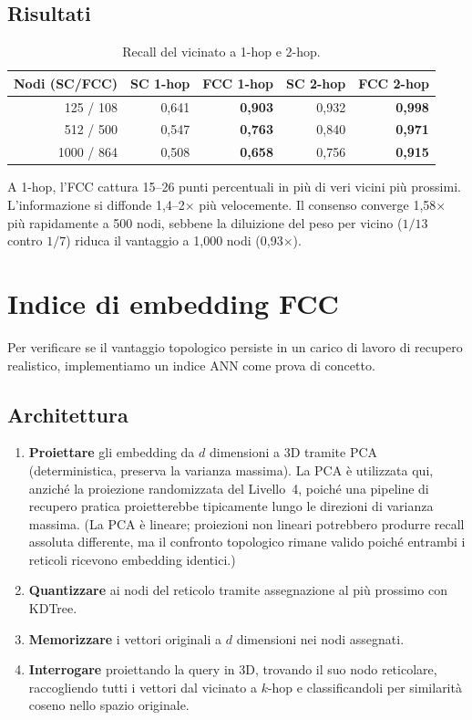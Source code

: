\documentclass[11pt]{article}
\begin{document}
\subsection{Risultati}

\begin{table}[H]
\centering
\caption{Recall del vicinato a 1-hop e 2-hop.}
\label{tab:recall}
\begin{tabular}{rrrrr}
\toprule
Nodi (SC/FCC) & SC 1-hop & FCC 1-hop & SC 2-hop & FCC 2-hop \\
\midrule
125 / 108   & 0,641 & \textbf{0,903} & 0,932 & \textbf{0,998} \\
512 / 500   & 0,547 & \textbf{0,763} & 0,840 & \textbf{0,971} \\
1000 / 864  & 0,508 & \textbf{0,658} & 0,756 & \textbf{0,915} \\
\bottomrule
\end{tabular}
\end{table}

A 1-hop, l'FCC cattura 15--26 punti percentuali in pi\`u di veri
vicini pi\`u prossimi. L'informazione si diffonde 1,4--2$\times$ pi\`u
velocemente. Il consenso converge 1,58$\times$ pi\`u rapidamente a 500
nodi, sebbene la diluizione del peso per vicino ($1/13$ contro $1/7$)
riduca il vantaggio a 1{,}000 nodi (0,93$\times$).

\section{Indice di embedding FCC}
\label{sec:index}

Per verificare se il vantaggio topologico persiste in un carico di
lavoro di recupero realistico, implementiamo un indice ANN come prova
di concetto.

\subsection{Architettura}

\begin{enumerate}
  \item \textbf{Proiettare} gli embedding da $d$ dimensioni a 3D tramite
    PCA (deterministica, preserva la varianza massima). La PCA \`e
    utilizzata qui, anzich\'e la proiezione randomizzata del Livello~4,
    poich\'e una pipeline di recupero pratica proietterebbe tipicamente
    lungo le direzioni di varianza massima. (La PCA \`e lineare;
    proiezioni non lineari potrebbero produrre recall assoluta differente,
    ma il confronto topologico rimane valido poich\'e entrambi i reticoli
    ricevono embedding identici.)
  \item \textbf{Quantizzare} ai nodi del reticolo tramite assegnazione al
    pi\`u prossimo con KDTree.
  \item \textbf{Memorizzare} i vettori originali a $d$ dimensioni nei
    nodi assegnati.
  \item \textbf{Interrogare} proiettando la query in 3D, trovando il suo
    nodo reticolare, raccogliendo tutti i vettori dal vicinato a $k$-hop
    e classificandoli per similarit\`a coseno nello spazio originale.
\end{enumerate}
\end{document}
